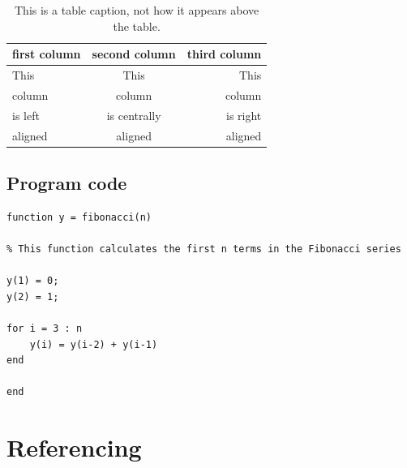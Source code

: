 \begin{table}[H]
	\caption{This is a table caption, not how it appears above the table.}
	\label{tab:table label} %
	\begin{center}
		\begin{tabular}{lcr} %
			\toprule %
			first column & second column & third column \\
			\midrule %
			This & This & This \\
			column & column & column \\
			is left & is centrally & is right \\
			aligned & aligned & aligned \\
			\bottomrule %
		\end{tabular}
	\end{center}
\end{table}

\subsection{Program code}

\begin{lstlisting}[style=matlabcode,
    caption = A MATLAB function to compute the first $n$ numbers of the Fibonacci series,
    label = mat:fibonacci
    ]
function y = fibonacci(n)

% This function calculates the first n terms in the Fibonacci series

y(1) = 0;
y(2) = 1;

for i = 3 : n
    y(i) = y(i-2) + y(i-1)
end

end
\end{lstlisting}

\section{Referencing}

